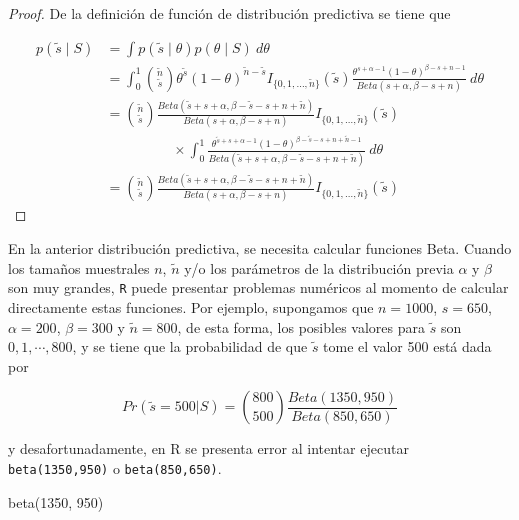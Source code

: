 \documentclass[
  12pt,
  spanish,
]{book}
\newenvironment{Shaded}{\begin{snugshade}}{\end{snugshade}}
\newcommand{\DecValTok}[1]{\textcolor[rgb]{0.00,0.00,0.81}{#1}}
\newcommand{\FunctionTok}[1]{\textcolor[rgb]{0.00,0.00,0.00}{#1}}
\newcommand{\NormalTok}[1]{#1}
\theoremstyle{definition}
\theoremstyle{definition}
\theoremstyle{definition}
\theoremstyle{definition}
\theoremstyle{remark}
\begin{document}
\begin{proof}
\iffalse{} {Prueba. } \fi{}De la definición de función de distribución predictiva se tiene que

\begin{align*}
p(\tilde{s} \mid S)&=\int p(\tilde{s} \mid \theta)p(\theta \mid S)\ d\theta\\
&=\int_0^1 \binom{\tilde{n}}{\tilde{s}} \theta^{\tilde{s}}(1-\theta)^{\tilde{n}-\tilde{s}}I_{\{0,1,\ldots,\tilde{n}\}}(\tilde{s})
\frac{\theta^{s+\alpha-1}(1-\theta)^{\beta-s+n-1}}{Beta(s+\alpha,\beta-s+n)}\ d\theta\\
&=\binom{\tilde{n}}{\tilde{s}}\frac{Beta(\tilde{s}+s+\alpha,\beta-\tilde{s}-s+n+\tilde{n})}{Beta(s+\alpha,\beta-s+n)}I_{\{0,1,\ldots,\tilde{n}\}}(\tilde{s})\\
& \hspace{2cm}\times
\int_0^1\frac{\theta^{\tilde{s}+s+\alpha-1}(1-\theta)^{\beta-\tilde{s}-s+n+\tilde{n}-1}}
{Beta(\tilde{s}+s+\alpha,\beta-\tilde{s}-s+n+\tilde{n})}\ d\theta\\
&=\binom{\tilde{n}}{\tilde{s}}\frac{Beta(\tilde{s}+s+\alpha,\beta-\tilde{s}-s+n+\tilde{n})}{Beta(s+\alpha,\beta-s+n)}I_{\{0,1,\ldots,\tilde{n}\}}(\tilde{s})
\end{align*}
\end{proof}

En la anterior distribución predictiva, se necesita calcular funciones
Beta. Cuando los tamaños muestrales \(n\), \(\tilde{n}\) y/o los
parámetros de la distribución previa \(\alpha\) y \(\beta\) son muy grandes,
\texttt{R} puede presentar problemas numéricos al momento de calcular directamente estas funciones. Por ejemplo, supongamos que \(n=1000\), \(s=650\), \(\alpha=200\), \(\beta=300\) y \(\tilde{n}=800\), de esta forma, los posibles
valores para \(\tilde{s}\) son \(0,1,\cdots,800\), y se tiene que la
probabilidad de que \(\tilde{s}\) tome el valor 500 está dada por

\begin{equation}
\label{eq:Ejebinom}
Pr(\tilde{s}=500|S)=
\binom{800}{500}\frac{Beta(1350,950)}{Beta(850,650)}
\end{equation}

y desafortunadamente, en \textsf{R} se presenta error al intentar
ejecutar \texttt{beta(1350,950)} o \texttt{beta(850,650)}.

\begin{Shaded}
\begin{Highlighting}[]
\FunctionTok{beta}\NormalTok{(}\DecValTok{1350}\NormalTok{, }\DecValTok{950}\NormalTok{)}
\end{Highlighting}
\end{Shaded}
\end{document}
